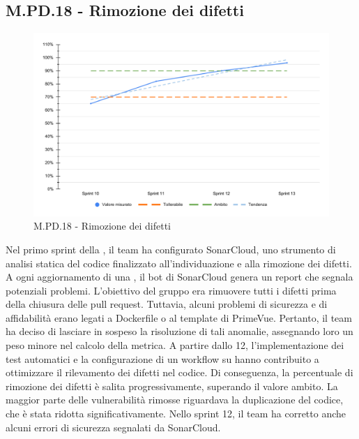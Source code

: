 \subsection{M.PD.18 - Rimozione dei difetti}

\begin{figure}[H]
  \centering
  \includegraphics[width=\textwidth]{assets/rimozione_difetti.pdf}
  \caption{M.PD.18 - Rimozione dei difetti}
\end{figure}

\par Nel primo sprint della , il team ha configurato SonarCloud, uno strumento di analisi statica del codice finalizzato all'individuazione e alla rimozione dei difetti. A ogni aggiornamento di una , il bot di SonarCloud genera un report che segnala potenziali problemi. L'obiettivo del gruppo era rimuovere tutti i difetti prima della chiusura delle pull request. Tuttavia, alcuni problemi di sicurezza e di affidabilità erano legati a Dockerfile o al template di PrimeVue. Pertanto, il team ha deciso di lasciare in sospeso la risoluzione di tali anomalie, assegnando loro un peso minore nel calcolo della metrica. A partire dallo  12, l'implementazione dei test automatici e la configurazione di un workflow su  hanno contribuito a ottimizzare il rilevamento dei difetti nel codice. Di conseguenza, la percentuale di rimozione dei difetti è salita progressivamente, superando il valore ambito. La maggior parte delle vulnerabilità rimosse riguardava la duplicazione del codice, che è stata ridotta significativamente. Nello sprint 12, il team ha corretto anche alcuni errori di sicurezza segnalati da SonarCloud.